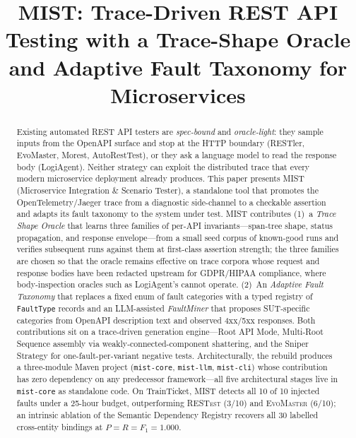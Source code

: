 \documentclass[conference]{IEEEtran}
\title{MIST: Trace-Driven REST API Testing with a Trace-Shape Oracle and Adaptive Fault Taxonomy for Microservices}
\author{\IEEEauthorblockN{Tingshuo Miao}\IEEEauthorblockA{Department of Computer Science\\Baylor University, USA\\Email: tingshuo\_miao2@baylor.edu}}
\begin{document}
\maketitle

\begin{abstract}
Existing automated REST API testers are \emph{spec-bound} and \emph{oracle-light}: they sample inputs from the OpenAPI surface and stop at the HTTP boundary (RESTler, EvoMaster, Morest, AutoRestTest), or they ask a language model to read the response body (LogiAgent). Neither strategy can exploit the distributed trace that every modern microservice deployment already produces. This paper presents \textsc{MIST} (Microservice Integration \& Scenario Tester), a standalone tool that promotes the OpenTelemetry/Jaeger trace from a diagnostic side-channel to a checkable assertion and adapts its fault taxonomy to the system under test. \textsc{MIST} contributes (1)~a \emph{Trace Shape Oracle} that learns three families of per-API invariants---span-tree shape, status propagation, and response envelope---from a small seed corpus of known-good runs and verifies subsequent runs against them at first-class assertion strength; the three families are chosen so that the oracle remains effective on trace corpora whose request and response bodies have been redacted upstream for GDPR/HIPAA compliance, where body-inspection oracles such as LogiAgent's cannot operate. (2)~An \emph{Adaptive Fault Taxonomy} that replaces a fixed enum of fault categories with a typed registry of \texttt{FaultType} records and an LLM-assisted \emph{FaultMiner} that proposes SUT-specific categories from OpenAPI description text and observed 4xx/5xx responses. Both contributions sit on a trace-driven generation engine---Root API Mode, Multi-Root Sequence assembly via weakly-connected-component shattering, and the Sniper Strategy for one-fault-per-variant negative tests. Architecturally, the rebuild produces a three-module Maven project (\texttt{mist-core}, \texttt{mist-llm}, \texttt{mist-cli}) whose contribution has zero dependency on any predecessor framework---all five architectural stages live in \texttt{mist-core} as standalone code. On TrainTicket, \textsc{MIST} detects all 10 of 10 injected faults under a 25-hour budget, outperforming \textsc{RESTest} (3/10) and \textsc{EvoMaster} (6/10); an intrinsic ablation of the Semantic Dependency Registry recovers all 30 labelled cross-entity bindings at $P{=}R{=}F_1{=}1.000$.
\end{abstract}
\end{document}
